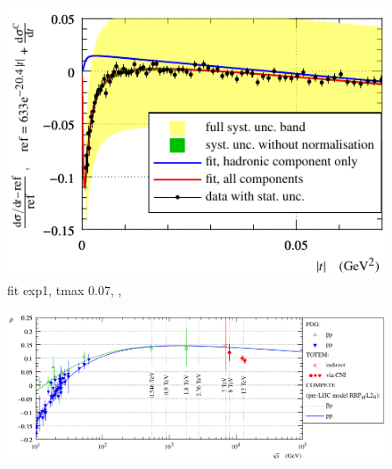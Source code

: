 \begin{figure}
\vskip-5mm
\begin{center}
\includegraphics{fig/fit_details_exp1_0p07.pdf}
\caption{%
fit exp1, tmax 0.07,
,
}
\label{fig:fit exp1 0.07}
\end{center}
\end{figure}




\begin{figure}
\vskip-5mm
\begin{center}
\includegraphics{fig/rho_vs_s.pdf}
\caption{%
}
\label{fig:rho_vs_s}
\end{center}
\end{figure}
